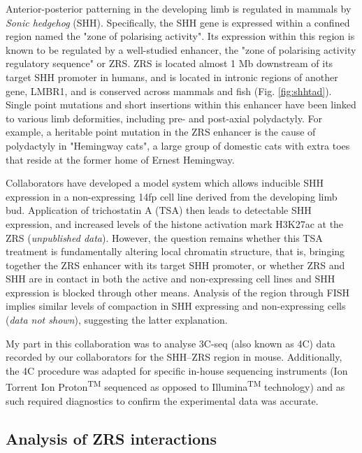 \documentclass[a4paper,11pt,oneside]{book}
\begin{document}
Anterior-posterior patterning in the developing limb is regulated in mammals by \emph{Sonic hedgehog} (SHH).\cite{Anderson2012} Specifically, the SHH gene is expressed within a confined region named the "zone of polarising activity". Its expression within this region is known to be regulated by a well-studied enhancer, the "zone of polarising activity regulatory sequence" or ZRS.\cite{Hill2013a} ZRS is located almost 1 Mb downstream of its target SHH promoter in humans, and is located in intronic regions of another gene, LMBR1, and is conserved across mammals and fish (Fig. \ref{fig:shhtad}).\cite{Hill2013a, Laurell2012} Single point mutations and short insertions within this enhancer have been linked to various limb deformities, including pre- and post-axial polydactyly.\cite{Anderson2012, Lettice2008, Laurell2012} For example, a heritable point mutation in the ZRS enhancer is the cause of polydactyly in "Hemingway cats", a large group of domestic cats with extra toes that reside at the former home of Ernest Hemingway.\cite{Lettice2008}  

Collaborators have developed a model system which allows inducible SHH expression in a non-expressing 14fp cell line derived from the developing limb bud. Application of trichostatin A (TSA) then leads to detectable SHH expression, and increased levels of the histone activation mark H3K27ac at the ZRS (\emph{unpublished data}). However, the question remains whether this TSA treatment is fundamentally altering local chromatin structure, that is, bringing together the ZRS enhancer with its target SHH promoter, or whether ZRS and SHH are in contact in both the active and non-expressing cell lines and SHH expression is blocked through other means. Analysis of the region through FISH implies similar levels of compaction in SHH expressing and non-expressing cells (\emph{data not shown}), suggesting the latter explanation.

My part in this collaboration was to analyse 3C-seq (also known as 4C) data recorded by our collaborators for the SHH--ZRS region in mouse. Additionally, the 4C procedure\cite{Stadhouders2013} was adapted for specific in-house sequencing instruments (Ion Torrent Ion Proton\textsuperscript{TM} sequenced as opposed to Illumina\textsuperscript{TM} technology) and as such required diagnostics to confirm the experimental data was accurate. 


\subsection{Analysis of ZRS interactions}
\end{document}
